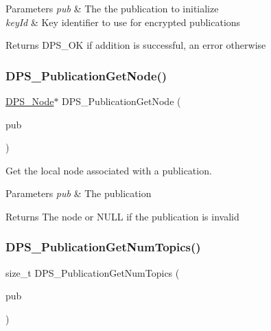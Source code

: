 \begin{DoxyParams}{Parameters}
{\em pub} & The the publication to initialize \\
\hline
{\em key\+Id} & Key identifier to use for encrypted publications\\
\hline
\end{DoxyParams}
\begin{DoxyReturn}{Returns}
D\+P\+S\+\_\+\+OK if addition is successful, an error otherwise 
\end{DoxyReturn}
\mbox{\label{group__publication_gad2a37d52f12c93434b431eefd732f363}} 
\subsubsection{\texorpdfstring{D\+P\+S\+\_\+\+Publication\+Get\+Node()}{DPS\_PublicationGetNode()}}
{\footnotesize\ttfamily \hyperlink{group__node_ga4dd612ab965134321bb57fdb065f121c}{D\+P\+S\+\_\+\+Node}$\ast$ D\+P\+S\+\_\+\+Publication\+Get\+Node (\begin{DoxyParamCaption}\item[{const \hyperlink{group__publication_ga0d439693474aa54e27f3d45a054696ac}{D\+P\+S\+\_\+\+Publication} $\ast$}]{pub }\end{DoxyParamCaption})}



Get the local node associated with a publication. 


\begin{DoxyParams}{Parameters}
{\em pub} & The publication\\
\hline
\end{DoxyParams}
\begin{DoxyReturn}{Returns}
The node or N\+U\+LL if the publication is invalid 
\end{DoxyReturn}
\mbox{\label{group__publication_gaee6fc3b13484faacff0d26646778f777}} 
\subsubsection{\texorpdfstring{D\+P\+S\+\_\+\+Publication\+Get\+Num\+Topics()}{DPS\_PublicationGetNumTopics()}}
{\footnotesize\ttfamily size\+\_\+t D\+P\+S\+\_\+\+Publication\+Get\+Num\+Topics (\begin{DoxyParamCaption}\item[{const \hyperlink{group__publication_ga0d439693474aa54e27f3d45a054696ac}{D\+P\+S\+\_\+\+Publication} $\ast$}]{pub }\end{DoxyParamCaption})}



